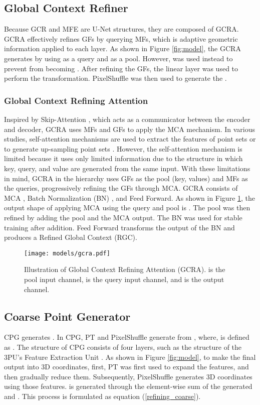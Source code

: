 \documentclass{article}
\begin{document}
\subsection{Global Context Refiner}
\quad  Because GCR and MFE are U-Net \cite{ronneberger2015u} structures, they are composed of  GCRA. GCRA effectively refines GFs by querying MFs, which is adaptive geometric information applied to each layer. As shown in Figure \ref{fig:model}, the  GCRA  generates  by using  as a query and  as a pool. However,  was used instead to prevent  from becoming . After refining the GFs, the linear layer was used to perform the transformation. PixelShuffle was then used to generate the .

\subsubsection{Global Context Refining Attention} \quad Inspired by Skip-Attention \cite{wen2020point}, which acts as a communicator between the encoder and decoder, GCRA uses MFs and GFs to apply the MCA mechanism. In various studies, self-attention mechanisms are used to extract the features of point sets or to generate up-sampling point sets \cite{qiu2021pu,li2019pu}. However, the self-attention mechanism is limited because it uses only limited information due to the structure in which key, query, and value are generated from the same input. With these limitations in mind, GCRA in the  hierarchy uses GFs as the pool (key, values) and MFs as the queries, progressively refining the GFs through MCA. GCRA consists of MCA \cite{vaswani2017attention}, Batch Normalization (BN) \cite{ioffe2015batch}, and Feed Forward. As shown in Figure \ref{fig:clf}, the output shape of applying MCA using the query and pool is . The pool was then refined by adding the pool and the MCA output. The BN was used for stable training after addition. Feed Forward transforms the output of the BN and produces a Refined Global Context (RGC).

\begin{figure}[htb!]
  \centering
\texttt{[image: models/gcra.pdf]}
\caption{Illustration of Global Context Refining Attention (GCRA).  is the pool input channel,  is the query input channel, and  is the output channel.}
\label{fig:clf}
\end{figure}

\subsection{Coarse Point Generator}
\label{sec:coarse_point_generator}
\quad CPG generates . In CPG, PT \cite{zhao2021point} and PixelShuffle \cite{shi2016real,qiu2021pu} generate  from , where,  is defined as . The structure of CPG consists of four layers, such as the structure of the 3PU's Feature Extraction Unit \cite{yifan2019patch}. As shown in Figure \ref{fig:model}, to make the final output into 3D coordinates, first, PT was first used to expand the features, and then gradually reduce them. Subsequently, PixelShuffle generates 3D coordinates using those features.  is generated through the element-wise sum of the generated  and . This process is formulated as equation (\ref{refining_coarse}).
\end{document}

